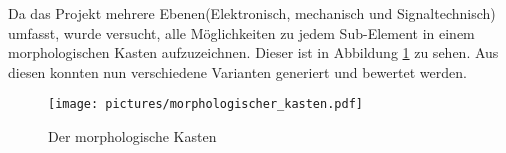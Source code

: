 Da das Projekt mehrere Ebenen(Elektronisch, mechanisch und Signaltechnisch) umfasst, wurde versucht, alle Möglichkeiten zu jedem Sub-Element in einem morphologischen Kasten aufzuzeichnen. Dieser ist in Abbildung \ref{pic:morphologischer_kasten} zu sehen. Aus diesen konnten nun verschiedene Varianten generiert und bewertet werden.
\begin{figure}[H]
	\texttt{[image: pictures/morphologischer\_kasten.pdf]}
	\caption{Der morphologische Kasten}
	\label{pic:morphologischer_kasten}
\end{figure}